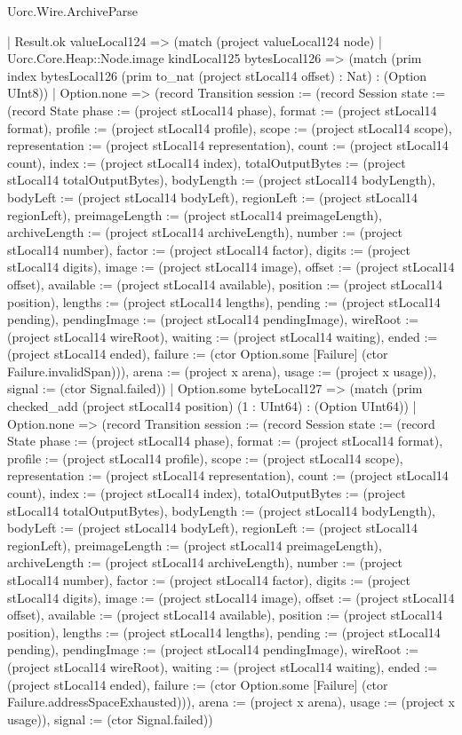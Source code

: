 \begin{lexlean}{Uorc.Wire.ArchiveParse}
\begin{semanticmodule}
{          | Result.ok valueLocal124 => (match (project valueLocal124 node)
            | Uorc.Core.Heap::Node.image kindLocal125 bytesLocal126 => (match (prim index bytesLocal126 (prim to_nat (project stLocal14 offset) : Nat) : (Option UInt8))
              | Option.none => (record Transition {session := (record Session {state := (record State {phase := (project stLocal14 phase), format := (project stLocal14 format), profile := (project stLocal14 profile), scope := (project stLocal14 scope), representation := (project stLocal14 representation), count := (project stLocal14 count), index := (project stLocal14 index), totalOutputBytes := (project stLocal14 totalOutputBytes), bodyLength := (project stLocal14 bodyLength), bodyLeft := (project stLocal14 bodyLeft), regionLeft := (project stLocal14 regionLeft), preimageLength := (project stLocal14 preimageLength), archiveLength := (project stLocal14 archiveLength), number := (project stLocal14 number), factor := (project stLocal14 factor), digits := (project stLocal14 digits), image := (project stLocal14 image), offset := (project stLocal14 offset), available := (project stLocal14 available), position := (project stLocal14 position), lengths := (project stLocal14 lengths), pending := (project stLocal14 pending), pendingImage := (project stLocal14 pendingImage), wireRoot := (project stLocal14 wireRoot), waiting := (project stLocal14 waiting), ended := (project stLocal14 ended), failure := (ctor Option.some [Failure] (ctor Failure.invalidSpan))}), arena := (project x arena), usage := (project x usage)}), signal := (ctor Signal.failed)})
              | Option.some byteLocal127 => (match (prim checked_add (project stLocal14 position) (1 : UInt64) : (Option UInt64))
                | Option.none => (record Transition {session := (record Session {state := (record State {phase := (project stLocal14 phase), format := (project stLocal14 format), profile := (project stLocal14 profile), scope := (project stLocal14 scope), representation := (project stLocal14 representation), count := (project stLocal14 count), index := (project stLocal14 index), totalOutputBytes := (project stLocal14 totalOutputBytes), bodyLength := (project stLocal14 bodyLength), bodyLeft := (project stLocal14 bodyLeft), regionLeft := (project stLocal14 regionLeft), preimageLength := (project stLocal14 preimageLength), archiveLength := (project stLocal14 archiveLength), number := (project stLocal14 number), factor := (project stLocal14 factor), digits := (project stLocal14 digits), image := (project stLocal14 image), offset := (project stLocal14 offset), available := (project stLocal14 available), position := (project stLocal14 position), lengths := (project stLocal14 lengths), pending := (project stLocal14 pending), pendingImage := (project stLocal14 pendingImage), wireRoot := (project stLocal14 wireRoot), waiting := (project stLocal14 waiting), ended := (project stLocal14 ended), failure := (ctor Option.some [Failure] (ctor Failure.addressSpaceExhausted))}), arena := (project x arena), usage := (project x usage)}), signal := (ctor Signal.failed)})
}
\end{semanticmodule}
\end{lexlean}
